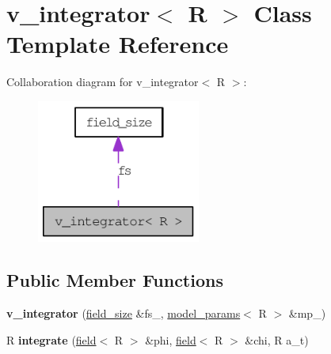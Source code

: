 \hypertarget{classv__integrator}{
\section{v\_\-integrator$<$ R $>$ Class Template Reference}
\label{classv__integrator}
}
Collaboration diagram for v\_\-integrator$<$ R $>$:\nopagebreak
\begin{figure}[H]
\begin{center}
\leavevmode
\includegraphics[width=152pt]{classv__integrator__coll__graph}
\end{center}
\end{figure}
\subsection*{Public Member Functions}
\begin{DoxyCompactItemize}
\item 
\hypertarget{classv__integrator_a2f408bba9ba58a93d1528b0a24550e4b}{
{\bfseries v\_\-integrator} (\hyperlink{structfield__size}{field\_\-size} \&fs\_\-, \hyperlink{structmodel__params}{model\_\-params}$<$ R $>$ \&mp\_\-)}
\label{classv__integrator_a2f408bba9ba58a93d1528b0a24550e4b}

\item 
\hypertarget{classv__integrator_a2540dad37d2abb657133673f647572d8}{
R {\bfseries integrate} (\hyperlink{classfield}{field}$<$ R $>$ \&phi, \hyperlink{classfield}{field}$<$ R $>$ \&chi, R a\_\-t)}
\label{classv__integrator_a2540dad37d2abb657133673f647572d8}

\end{DoxyCompactItemize}
